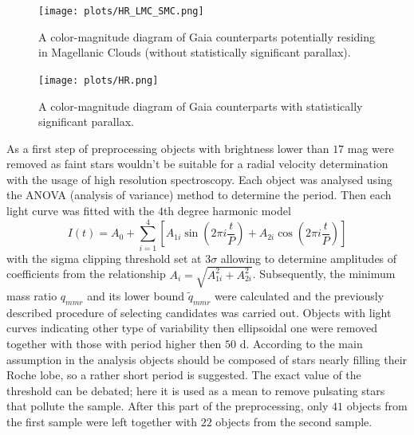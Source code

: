 \documentclass{pracalicmgr}
\begin{document}
\begin{figure}[H]
    \begin{center}
        \texttt{[image: plots/HR\_LMC\_SMC.png]}
    \end{center}
    \caption{A color-magnitude diagram of Gaia counterparts potentially residing in Magellanic Clouds (without statistically significant parallax).}
    \label{HR_SMC}
\end{figure}

\begin{figure}[H]
    \begin{center}
        \texttt{[image: plots/HR.png]}
    \end{center}
    \caption{A color-magnitude diagram of Gaia counterparts with statistically significant parallax.}
    \label{HR_galactic}
\end{figure}
As a first step of preprocessing objects with brightness lower than
$17$ mag  were removed as faint stars wouldn't be suitable for a radial velocity determination with the usage of high resolution spectroscopy.
Each object was analysed using the ANOVA (analysis of variance) method \citep{schwarzenberg-czerny_advantage_1989} to determine the period.
Then each light curve was fitted with the $4$th degree harmonic model
\begin{equation}\label{harm}
    I(t)=A_0+\sum_{i=1}^4\left[ A_{1i}\sin{\left(2\pi i\frac{t}{P}\right)}+A_{2i}\cos{\left(2\pi i\frac{t}{P}\right)}\right]
\end{equation}
with the sigma clipping threshold set at $3\sigma$ allowing to determine amplitudes of coefficients from the relationship $A_i=\sqrt{A_{1i}^2+A_{2i}^2}$.
Subsequently, the minimum mass ratio $q_{mmr}$ and its lower bound $\tilde{q}_{mmr}$ were calculated and the previously described procedure of selecting candidates was carried out.
Objects with light curves indicating other type of variability then ellipsoidal one were removed together with those with period higher then
$50$ d. According to the main assumption in the analysis objects should be composed of stars nearly filling their Roche lobe, so a rather short period is suggested. The exact value of the threshold can be debated; here it is used as a mean to
remove pulsating stars that pollute the sample. After this part of the preprocessing, only $41$ objects from the first sample were left together with $22$ objects from the second sample.
\end{document}
